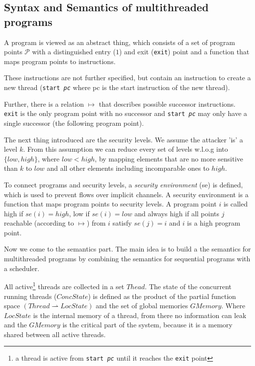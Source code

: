 \documentclass[a4paper,10pt]{llncs}
\theoremstyle{definition}
\begin{document}
\subsection{Syntax and Semantics of multithreaded programs}
\label{sec:syntaxsemantics}
A program is viewed as an abstract thing, which consists of a set of
program points $\mathcal{P}$ with a distinguished entry ($1$) and exit
(\texttt{exit}) point and a function that maps program points to
instructions.

These instructions are not further specified, but contain an instruction
to create a new thread (\texttt{start \textit{pc}} where pc is the start
instruction of the new thread).

Further, there is a relation $\mapsto$ that describes possible successor
instructions. \texttt{exit} is the only program point with no successor
and \texttt{start \textit{pc}} may only have a single successor (the
following program point).

The next thing introduced are the security levels. We assume the attacker
'is' a level $k$. From this assumption we can reduce every set of levels
w.l.o.g into $\{low, high\}$, where $low < high$, by mapping elements
that are no more sensitive than $k$ to $low$ and all other elements
including incomparable ones to $high$.

To connect programs and security levels, a \textit{security environment}
(se) is defined, which is used to prevent flows over implicit channels.
A security environment is a function that maps program points to security
levels. A program point $i$ is called high if $se(i) = high$, low if $se(i)
= low$ and always high if all points $j$ reachable (according to $\mapsto$)
from $i$ satisfy $se(j) = i$ and $i$ is a high program point.

Now we come to the semantics part. The main idea is to build a the semantics
for multithreaded programs by combining the semantics for sequential programs
with a scheduler.

All active\footnote{a thread is active from \texttt{start \textit{pc}} until
it reaches the \texttt{exit} point} threads are collected in a set $Thead$.
The state of the concurrent running threads ($ConcState$) is defined as the
product of the partial function space $(Thread \rightharpoonup LocState)$
and the set of global memories $GMemory$. Where $LocState$ is the internal
memory of a thread, from there no information can leak and the $GMemory$ is
the critical part of the system, because it is a memory shared between all
active threads.
\end{document}
